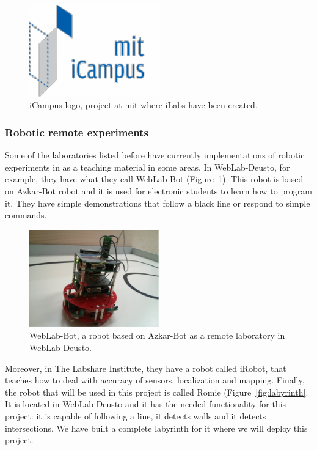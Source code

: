\begin{figure}[!htbp]
	\centering
	\includegraphics[width=0.5\textwidth]{fig/icampus}
	\caption{iCampus logo, project at \acrshort{mit} where iLabs have been created.}
\end{figure}

\subsubsection{Robotic remote experiments}

Some of the laboratories listed before have currently implementations of robotic experiments in
as a teaching material in some areas. In WebLab-Deusto, for example, they have what they call
WebLab-Bot (Figure~\ref{fig:weblab-bot}). This robot is based on Azkar-Bot robot and it is used for
electronic students to learn how to program it. They have simple demonstrations that follow a black
line or respond to simple commands.

\begin{figure}[!htbp]
	\centering
	\includegraphics[width=0.5\textwidth]{fig/weblab-bot}
	\caption{WebLab-Bot, a robot based on Azkar-Bot as a remote laboratory in WebLab-Deusto.}
	\label{fig:weblab-bot}
\end{figure}

Moreover, in The Labshare Institute, they have a robot called iRobot, that teaches how to deal with
accuracy of sensors, localization and mapping. Finally, the robot that will be used in this
project is called Romie (Figure~\ref{fig:labyrinth}. It is located in WebLab-Deusto and it has the
needed functionality for this project: it is capable of following a line, it detects walls and it
detects intersections. We have built a complete labyrinth for it where we will deploy this project.

